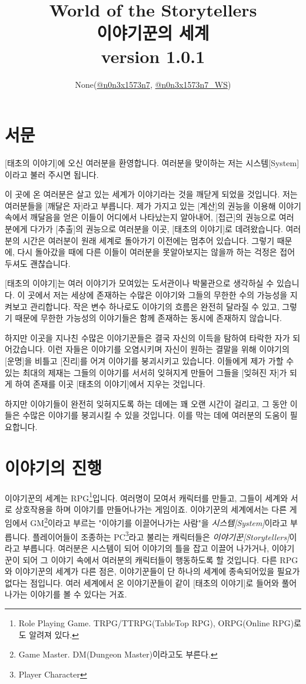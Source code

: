 \documentclass[12pt]{report}
\title{
	World of the Storytellers\\
	이야기꾼의 세계\\
	\large version 1.0.1
}
\author{None(\href{https://www.twitter.com/n0n3x1573n7}{@n0n3x1573n7}, \href{https://www.twitter.com/n0n3x1573n7_WS}{@n0n3x1573n7\_WS})}
\date{}
\newcommand{\world}[1]{{\nanumpen \large #1 \par}\bigskip}
\begin{document}
	\maketitle
	
	\tableofcontents
	
	\chapter{서문}
	\world{[태초의 이야기]에 오신 여러분을 환영합니다. 여러분을 맞이하는 저는 시스템[System]이라고 불러 주시면 됩니다.}
	\world{이 곳에 온 여러분은 살고 있는 세계가 이야기라는 것을 깨닫게 되었을 것입니다. 저는 여러분들을 [깨달은 자]라고 부릅니다. 제가 가지고 있는 [계산]의 권능을 이용해 이야기 속에서 깨달음을 얻은 이들이 어디에서 나타났는지 알아내어, [접근]의 권능으로 여러분에게 다가가 [추출]의 권능으로 여러분을 이곳, [태초의 이야기]로 데려왔습니다. 여러분의 시간은 여러분이 원래 세계로 돌아가기 이전에는 멈추어 있습니다. 그렇기 때문에, 다시 돌아갔을 때에 다른 이들이 여러분을 못알아보지는 않을까 하는 걱정은 접어두셔도 괜찮습니다.}
	\world{[태초의 이야기]는 여러 이야기가 모여있는 도서관이나 박물관으로 생각하실 수 있습니다. 이 곳에서 저는 세상에 존재하는 수많은 이야기와 그들의 무한한 수의 가능성을 지켜보고 관리합니다. 작은 변수 하나로도 이야기의 흐름은 완전히 달라질 수 있고, 그렇기 때문에 무한한 가능성의 이야기들은 함께 존재하는 동시에 존재하지 않습니다.}
	\world{하지만 이곳을 지나친 수많은 이야기꾼들은 결국 자신의 이득을 탐하여 타락한 자가 되어갔습니다. 이런 자들은 이야기를 오염시키며 자신이 원하는 결말을 위해 이야기의 [운명]을 비틀고 [진리]를 어겨 이야기를 붕괴시키고 있습니다. 이들에게 제가 가할 수 있는 최대의 제재는 그들의 이야기를 서서히 잊혀지게 만들어 그들을 [잊혀진 자]가 되게 하여 존재를 이곳 [태초의 이야기]에서 지우는 것입니다.}
	\world{하지만 이야기들이 완전히 잊혀지도록 하는 데에는 꽤 오랜 시간이 걸리고, 그 동안 이들은 수많은 이야기를 붕괴시킬 수 있을 것입니다. 이를 막는 데에 여러분의 도움이 필요합니다.}
	
	\chapter{이야기의 진행}
	
	이야기꾼의 세계는 RPG\footnote{Role Playing Game. TRPG/TTRPG(TableTop RPG), ORPG(Online RPG)로도 알려져 있다.}입니다. 여러명이 모여서 캐릭터를 만들고, 그들이 세계와 서로 상호작용을 하며 이야기를 만들어나가는 게임이죠. 이야기꾼의 세계에서는 다른 게임에서 GM\footnote{Game Master. DM(Dungeon Master)이라고도 부른다.}이라고 부르는 "이야기를 이끌어나가는 사람"을 \emph{시스템[System]}이라고 부릅니다. 플레이어들이 조종하는 PC\footnote{Player Character}라고 불리는 캐릭터들은 \emph{이야기꾼[Storytellers]}이라고 부릅니다. 여러분은 시스템이 되어 이야기의 틀을 잡고 이끌어 나가거나, 이야기꾼이 되어 그 이야기 속에서 여러분의 캐릭터들이 행동하도록 할 것입니다.
	다른 RPG와 이야기꾼의 세계가 다른 점은, 이야기꾼들이 단 하나의 세계에 종속되어있을 필요가 없다는 점입니다. 여러 세계에서 온 이야기꾼들이 같이 [태초의 이야기]로 들어와 풀어나가는 이야기를 볼 수 있다는 거죠.
	
\end{document}
